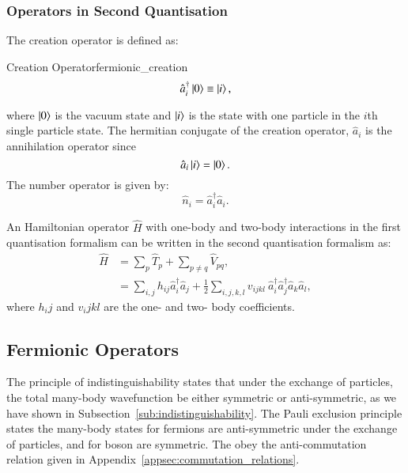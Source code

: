 \subsubsection{Operators in Second Quantisation}
\label{sub:second_quantization}
The creation operator is defined as:
\begin{definition}{Creation Operator}{fermionic_creation}
	\begin{equation}
		\hat a_i^\dagger \ket{0} \equiv \ket{i},
	\end{equation}	
\end{definition}
where $ \ket{0} $ is the vacuum state and $ \ket{i} $ is the state with one particle in the $ i $th single particle state.
The hermitian conjugate of the creation operator, $ \hat a_i $ is the annihilation operator since
\begin{equation}
	\hat a_i \ket{i} = \ket{0}.
\end{equation}
The number operator is given by:
\begin{equation}
	\label{eq:number_operator}
	\hat n_i = \hat a_i^\dagger \hat a_i.
\end{equation}

An Hamiltonian operator $ \hat H $ with one-body and two-body interactions in the first quantisation formalism can be written in the second quantisation formalism as:
\begin{equation}
	\begin{aligned}
		\hat H &= \sum_{p} \hat T_p + \sum_{p \neq q} \hat V_{pq}, \\
			&= \sum_{i,j} h_{ij} \hat a_i^\dagger \hat a_j + \frac{1}{2}\sum_{i,j,k,l} v_{ijkl} \ \hat a_i^\dagger \hat a_j^\dagger \hat a_k \hat a_l,
	\end{aligned}
\end{equation}
where $h_ij$ and $v_ijkl$ are the one- and two- body coefficients.


\subsection{Fermionic Operators}
\label{sub:fermionic}
The principle of indistinguishability states that under the exchange of particles, the total many-body wavefunction be either symmetric or anti-symmetric, as we have shown in Subsection~\ref{sub:indistinguishability}. The Pauli exclusion principle states the many-body states for fermions are anti-symmetric under the exchange of particles, and for boson are symmetric. The obey the anti-commutation relation given in Appendix~\ref{appsec:commutation_relations}.

